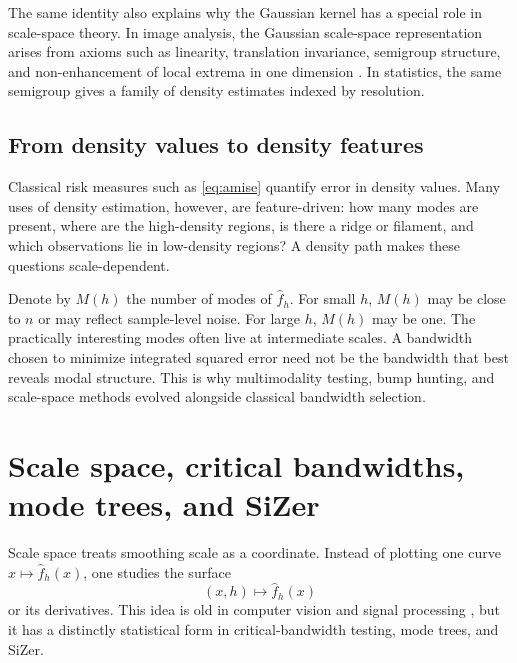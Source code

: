\documentclass[preprint]{imsart}
\theoremstyle{plain}
\theoremstyle{definition}
\newcommand{\fhat}{\widehat f}
\begin{document}
The same identity also explains why the Gaussian kernel has a special role in scale-space theory. In image analysis, the Gaussian scale-space representation arises from axioms such as linearity, translation invariance, semigroup structure, and non-enhancement of local extrema in one dimension \citep{witkin_1983_ScalespaceFiltering, koenderink_1984_StructureImages, babaud_1986_UniquenessGaussianKernel, lindeberg_1994_ScalespaceTheoryBasic}. In statistics, the same semigroup gives a family of density estimates indexed by resolution.

\subsection{From density values to density features}
\label{subsec:kde-features}

Classical risk measures such as \eqref{eq:amise} quantify error in density values. Many uses of density estimation, however, are feature-driven: how many modes are present, where are the high-density regions, is there a ridge or filament, and which observations lie in low-density regions? A density path makes these questions scale-dependent.

Denote by $M(h)$ the number of modes of $\fhat_h$. For small $h$, $M(h)$ may be close to $n$ or may reflect sample-level noise. For large $h$, $M(h)$ may be one. The practically interesting modes often live at intermediate scales. A bandwidth chosen to minimize integrated squared error need not be the bandwidth that best reveals modal structure. This is why multimodality testing, bump hunting, and scale-space methods evolved alongside classical bandwidth selection.





\section{Scale space, critical bandwidths, mode trees, and SiZer}
\label{sec:scale-space}

Scale space treats smoothing scale as a coordinate. Instead of plotting one curve $x\mapsto\fhat_h(x)$, one studies the surface
\[
  (x,h)\mapsto\fhat_h(x)
\]
or its derivatives. This idea is old in computer vision and signal processing \citep{witkin_1983_ScalespaceFiltering, koenderink_1984_StructureImages, lindeberg_1994_ScalespaceTheoryBasic}, but it has a distinctly statistical form in critical-bandwidth testing, mode trees, and SiZer.
\end{document}
